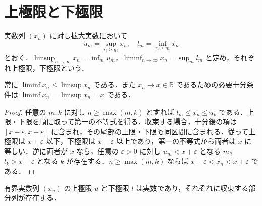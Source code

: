 \section{上極限と下極限}
\begin{defn}[実数列の上極限と下極限]
実数列 $(x_n)$ に対し拡大実数において
\[
 u_m=\sup_{n\geq m}x_n,\quad l_m=\inf_{n\geq m}x_n
\]
とおく．$\limsup_{n\to\infty}x_n=\inf_m u_m$，$\liminf_{n\to\infty}x_n=\sup_m l_m$ と定め，それぞれ上極限，下極限という．
\end{defn}
\begin{prop}
常に $\liminf x_n\leq\limsup x_n$ である．また $x_n\to x\in\mathbb R$ であるための必要十分条件は $\liminf x_n=\limsup x_n=x$ である．
\end{prop}
\begin{proof}
任意の $m,k$ に対し $n\geq\max(m,k)$ とすれば $l_m\leq x_n\leq u_k$ である．上限・下限を順に取って第一の不等式を得る．収束する場合，十分後の項は $[x-\varepsilon,x+\varepsilon]$ に含まれ，その尾部の上限・下限も同区間に含まれる．従って上極限は $x+\varepsilon$ 以下，下極限は $x-\varepsilon$ 以上であり，第一の不等式から両者は $x$ に等しい．逆に両者が $x$ なら，任意の $\varepsilon>0$ に対し $u_m<x+\varepsilon$ となる $m$，$l_k>x-\varepsilon$ となる $k$ が存在する．$n\geq\max(m,k)$ ならば $x-\varepsilon<x_n<x+\varepsilon$ である．
\end{proof}
\begin{prop}
有界実数列 $(x_n)$ の上極限 $u$ と下極限 $l$ は実数であり，それぞれに収束する部分列が存在する．
\end{prop}

